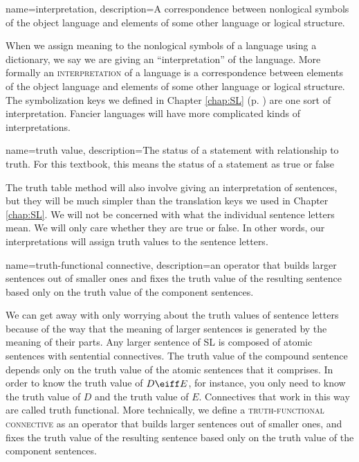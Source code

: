 {
name=interpretation,
description={A correspondence between nonlogical symbols of the object language and elements of some other language or logical structure.}
}

When we assign meaning to the nonlogical symbols of a language using a dictionary, we say we are giving an ``interpretation'' of the language. More formally an \textsc{\gls{interpretation}\label{def:interpretation}} of a language is a correspondence between elements of the object language and elements of some other language or logical structure. The symbolization keys we defined in Chapter \ref{chap:SL} (p. \pageref{def:translation_key}) are one sort of interpretation. Fancier languages will have more complicated kinds of interpretations.

{
  name=truth value,
  description={The status of a statement with relationship to truth. For  this textbook, this means the status of a statement as true or false}
}

The truth table method will also involve giving an interpretation of sentences, but they will be much simpler than the translation keys we used in Chapter \ref{chap:SL}. We will 
not be concerned with what the individual sentence letters mean. We will only care whether they are true or false. In other words, our interpretations will assign \glspl{truth 
value} to the sentence letters. 

{
name=truth-functional connective,
description={an operator that builds larger sentences out of smaller ones and fixes the truth value of the resulting sentence based only on the truth value of the component sentences.}
}

We can get away with only worrying about the truth values of sentence letters because of the way that the meaning of larger sentences is generated by the meaning of their parts. Any larger sentence of SL is composed of atomic sentences with sentential connectives. The truth value of the compound sentence depends only on the truth value of the atomic sentences that it comprises. In order to know the truth value of $D\eiff E$, for instance, you only need to know the truth value of $D$ and the truth value of $E$. Connectives that work in this way are called truth functional. More technically, we define a \textsc{\gls{truth-functional connective}} \label{def:truth-functional_connective}as an operator that builds larger sentences out of smaller ones, and fixes the truth value of the resulting sentence based only on the truth value of the component sentences. 

